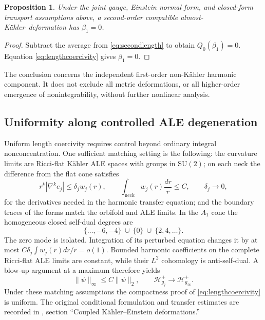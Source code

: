 \documentclass[11pt,a4paper]{article}
\newtheorem{proposition}[theorem]{Proposition}
\theoremstyle{definition}
\theoremstyle{remark}
\newcommand{\AK}{almost-K\"ahler}
\begin{document}
\begin{proposition}\label{prop:secondorder}
Under the joint gauge, Einstein normal form, and closed-form transport assumptions above, a second-order compatible \AK\ deformation has $\beta_1=0$.
\end{proposition}
\begin{proof}
Subtract the average from \eqref{eq:secondlength} to obtain $Q_0(\beta_1)=0$. Equation \eqref{eq:lengthcoercivity} gives $\beta_1=0$.
\end{proof}
The conclusion concerns the independent first-order non-K\"ahler harmonic component. It does not exclude all metric deformations, or all higher-order emergence of nonintegrability, without further nonlinear analysis.

\subsection{Uniformity along controlled ALE degeneration}
Uniform length coercivity requires control beyond ordinary integral nonconcentration. One sufficient matching setting is the following: the curvature limits are Ricci-flat K\"ahler ALE spaces with groups in $\mathrm{SU}(2)$; on each neck the difference from the flat cone satisfies
\[
 r^k|\nabla^ke_j|\le\delta_j w_j(r),\qquad
 \int_{\mathrm{neck}}w_j(r)\frac{dr}{r}\le C,\qquad \delta_j\to0,
\]
for the derivatives needed in the harmonic transfer equation; and the boundary traces of the forms match the orbifold and ALE limits. In the $A_1$ cone the homogeneous closed self-dual degrees are
\[
 \{\ldots,-6,-4\}\ \cup\ \{0\}\ \cup\ \{2,4,\ldots\}.
\]
The zero mode is isolated. Integration of its perturbed equation changes it by at most $C\delta_j\int w_j(r)dr/r=o(1)$. Bounded harmonic coefficients on the complete Ricci-flat ALE limits are constant, while their $L^2$ cohomology is anti-self-dual. A blow-up argument at a maximum therefore yields
\[
 \|\psi\|_\infty\le C\|\psi\|_2,\qquad \mathcal H_{g_j}^+\longrightarrow\mathcal H_{g_\infty}^+.
\]
Under these matching assumptions the compactness proof of \eqref{eq:lengthcoercivity} is uniform. The original conditional formulation and transfer estimates are recorded in \cite{Repository}, section ``Coupled K\"ahler--Einstein deformations.''
\end{document}
